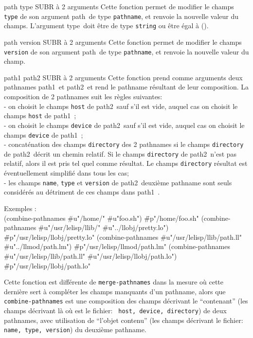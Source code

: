 {path type} {SUBR \`{a} 2 arguments}
Cette fonction permet de modifier le champs {\tt type} de son argument \LT path\GT\ de
type {\tt pathname}, et renvoie la nouvelle valeur du champs.
L'argument \LT type\GT\ doit \^{e}tre de type {\tt string} ou \^{e}tre \'{e}gal \`{a} ().

 {path version} {SUBR \`{a} 2 arguments}
Cette fonction permet de modifier le champs {\tt version} de son argument \LT path\GT\ de
type {\tt pathname}, et renvoie la nouvelle valeur du champ.

 {path1 path2} {SUBR \`{a} 2 arguments}
Cette fonction prend comme arguments deux pathnames \LT path1\GT\ et \LT
path2\GT\ et rend le pathname r\'{e}sultant de leur composition.
La composition de 2 pathnames suit les r\`{e}gles suivantes: \\
 - on choisit le champs {\tt host} de \LT path2\GT\, sauf s'il est
vide, auquel cas on choisit le champs {\tt host} de \LT path1\GT\ ; \\
 - on choisit le champs {\tt device} de \LT path2\GT\, sauf s'il est
vide, auquel cas on choisit le champs {\tt device} de \LT path1\GT\ ; \\
 - concat\'{e}nation des champs {\tt directory} des 2 pathnames 
si le champs {\tt directory} de \LT path2\GT\ d\'{e}crit un chemin
relatif. 
Si le champs {\tt directory} de \LT path2\GT\ n'est pas relatif, alors
il est pris tel quel comme r\'{e}sultat. Le champs {\tt directory}
r\'{e}sultat est \'{e}ventuellement simplifi\'{e} dans tous les cas; \\
 - les champs {\tt name}, {\tt type} et {\tt version} de \LT path2\GT\
deuxi\`{e}me pathname sont seuls consid\'{e}r\'{e}s au d\'{e}triment de 
ces champs dans \LT path1\GT\ .

Exemples :\\
\? {(combine-pathnames \#u"/home/" \#u"foo.sh")}
\= {\#p"/home/foo.sh"}
\? {(combine-pathnames \#u"/usr/lelisp/llib/" \#u"../llobj/pretty.lo")}
\= {\#p"/usr/lelisp/llobj/pretty.lo"}
\? {(combine-pathnames \#u"/usr/lelisp/llib/path.ll"
                       \#u"../llmod/path.lm")}
\= {\#p"/usr/lelisp/llmod/path.lm"}
\? {(combine-pathnames \#u"/usr/lelisp/llib/path.ll"
                       \#u"/usr/lelisp/llobj/path.lo")}
\= {\#p"/usr/lelisp/llobj/path.lo"}

Cette fonction est diff\'{e}rente de {\tt merge-pathnames} dans la mesure o\`{u}
cette derni\`{e}re sert \`{a} compl\'{e}ter les champs manquants d'un pathname, alors
que {\tt combine-pathnames} est une composition des champs d\'{e}crivant
le ``contenant{''} (les champs d\'{e}crivant l\`{a} o\`{u} est le fichier: {\tt
host, device, directory}) de deux 
pathnames, avec utilisation de ``l'objet contenu{''} (les champs
d\'{e}crivant le fichier: {\tt name, type, version}) du deuxi\`{e}me pathname.

